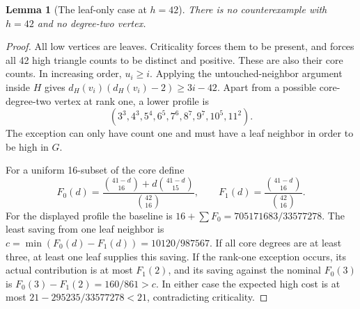 \documentclass[11pt,a4paper]{article}
\newtheorem{lemma}[theorem]{Lemma}
\theoremstyle{definition}\newtheorem{definition}[theorem]{Definition}
\theoremstyle{remark}\newtheorem{remark}[theorem]{Remark}
\begin{document}
\begin{lemma}[The leaf-only case at $h=42$]\label{paired:h42}
There is no counterexample with $h=42$ and no degree-two vertex.
\end{lemma}
\begin{proof}
All low vertices are leaves. Criticality forces them to be present,
and forces all 42 high triangle counts to be distinct and positive.
These are also their core counts. In increasing order, $u_i\ge i$.
Applying the untouched-neighbor argument inside $H$ gives
$d_H(v_i)(d_H(v_i)-2)\ge3i-42$. Apart from a possible core-degree-two
vertex at rank one, a lower profile is
\[
 (3^3,4^3,5^4,6^5,7^6,8^7,9^7,10^5,11^2).
\]
The exception can only have count one and must have a leaf neighbor
in order to be high in $G$.

For a uniform 16-subset of the core define
\[
 F_0(d)=\frac{\binom{41-d}{16}+d\binom{41-d}{15}}{\binom{42}{16}},
 \qquad F_1(d)=\frac{\binom{41-d}{16}}{\binom{42}{16}}.
\]
For the displayed profile the baseline is
$16+\sum F_0=705171683/33577278$. The least saving from one leaf
neighbor is
$c=\min(F_0(d)-F_1(d))=10120/987567$. If all core degrees are at
least three, at least one leaf supplies this saving. If the rank-one
exception occurs, its actual contribution is at most $F_1(2)$,
and its saving against the nominal $F_0(3)$ is
$F_0(3)-F_1(2)=160/861>c$. In either case the expected high cost is
at most $21-295235/33577278<21$, contradicting criticality.
\end{proof}
\end{document}
